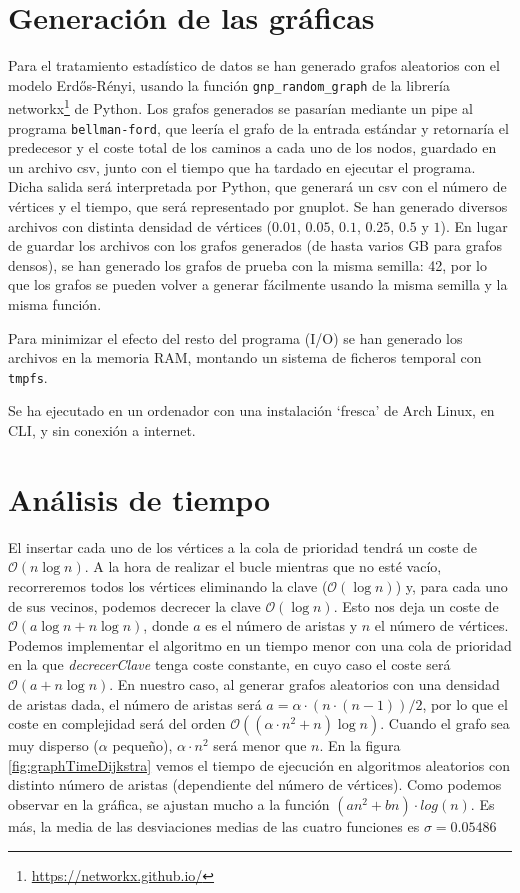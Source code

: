 \documentclass{article}
\begin{document}
\section{Generación de las gráficas}
Para el tratamiento estadístico de datos se han generado grafos aleatorios con el modelo Erdős-Rényi, usando la función \texttt{gnp\_random\_graph} de la librería networkx\footnote{\url{https://networkx.github.io/}} de Python. Los grafos generados se pasarían mediante un pipe al programa \texttt{bellman-ford}, que leería el grafo de la entrada estándar y retornaría el predecesor y el coste total de los caminos a cada uno de los nodos, guardado en un archivo csv, junto con el tiempo que ha tardado en ejecutar el programa. Dicha salida será interpretada por Python, que generará un csv con el número de vértices y el tiempo, que será representado por gnuplot. Se han generado diversos archivos con distinta densidad de vértices ($0.01$, $0.05$, $0.1$, $0.25$, $0.5$ y $1$). En lugar de guardar los archivos con los grafos generados (de hasta varios GB para grafos densos), se han generado los grafos de prueba con la misma semilla: 42, por lo que los grafos se pueden volver a generar fácilmente usando la misma semilla y la misma función.

Para minimizar el efecto del resto del programa (I/O) se han generado los archivos en la memoria RAM, montando un sistema de ficheros temporal con \texttt{tmpfs}.

Se ha ejecutado en un ordenador con una instalación `fresca' de Arch Linux, en CLI, y sin conexión a internet.

\newpage
\section{Análisis de tiempo}
El insertar cada uno de los vértices a la cola de prioridad tendrá un coste de $\mathcal{O}(n\log n)$. A la hora de realizar el bucle mientras que no esté vacío, recorreremos todos los vértices eliminando la clave ($\mathcal{O} (\log n)$) y, para cada uno de sus vecinos, podemos decrecer la clave $\mathcal{O}(\log n)$. Esto nos deja un coste de $\mathcal{O}\left(a\log n+n\log n\right)$, donde $a$ es el número de aristas y $n$ el número de vértices. Podemos implementar el algoritmo en un tiempo menor con una cola de prioridad en la que \textit{decrecerClave} tenga coste constante, en cuyo caso el coste será $\mathcal{O}(a + n\log n)$. En nuestro caso, al generar grafos aleatorios con una densidad de aristas dada, el número de aristas será $a = \alpha\cdot(n\cdot(n-1))/2$, por lo que el coste en complejidad será del orden $\mathcal{O}((\alpha\cdot n^2+n)\log n)$. Cuando el grafo sea muy disperso ($\alpha$ pequeño), $\alpha\cdot n^2$ será menor que $n$. En la figura \ref{fig:graphTimeDijkstra} vemos el tiempo de ejecución en algoritmos aleatorios con distinto número de aristas (dependiente del número de vértices). Como podemos observar en la gráfica, se ajustan mucho a la función $(an^2+bn)\cdot log(n)$. Es más, la media de las desviaciones medias de las cuatro funciones es $\sigma=0.05486$



\end{document}
